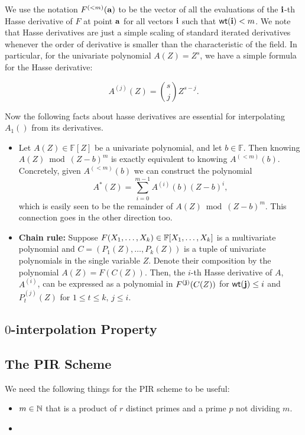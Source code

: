 We use the notation $F^{(<m)}(\mathbf{a})$ to be the vector of all the evaluations of the $\mathbf{i}$-th Hasse derivative of $F$ at point $\mathbf{a}$ for all vectors $\mathbf{i}$ such that $\operatorname{\mathsf{wt}}(\mathbf{i}) < m$. We note that Hasse derivatives are just a simple scaling of standard iterated derivatives whenever the order of derivative is smaller than the characteristic of the field. In particular, for the univariate polynomial $A(Z) = Z^s$, we have a simple formula for the Hasse derivative:

$$A^{(j)}(Z) = \binom{s}{j} Z^{s-j}.$$

Now the following facts about hasse derivatives are essential for interpolating $A_1()$ from its derivatives.

\begin{itemize}
    \item Let $A(Z) \in \mathbb{F}[Z]$ be a univariate polynomial, and let $b \in \mathbb{F}$. Then knowing $A(Z) \bmod (Z-b)^m$ is exactly equivalent to knowing $A^{(<m)}(b)$. Concretely, given $A^{(<m)}(b)$ we can construct the polynomial
    $$A^*(Z) = \sum_{i=0}^{m-1} A^{(i)}(b)(Z-b)^i,$$
    which is easily seen to be the remainder of $A(Z) \bmod (Z-b)^m$. This connection goes in the other direction too.

    \item \textbf{Chain rule:} Suppose $F(X_1, \ldots, X_k) \in \mathbb{F}[X_1, \ldots, X_k]$ is a multivariate polynomial and $C = (P_1(Z), \ldots, P_k(Z))$ is a tuple of univariate polynomials in the single variable $Z$. Denote their composition by the polynomial $A(Z) = F(C(Z))$. Then, the $i$-th Hasse derivative of $A$, $A^{(i)}$, can be expressed as a polynomial in $F^{(\mathbf{j})}(C(Z))$ for $\operatorname{\mathsf{wt}}(\mathbf{j}) \leq i$ and $P_t^{(j)}(Z)$ for $1 \leq t \leq k,\, j \leq i$.
\end{itemize}

\subsection{$0$-interpolation Property}




\subsection{The PIR Scheme}

We need the following things for the PIR scheme to be useful:

\begin{itemize}
    \item $m\in\mathbb{N}$ that is a product of $r$ distinct primes and a prime $p$ not dividing $m$. 
    \item 
\end{itemize}

